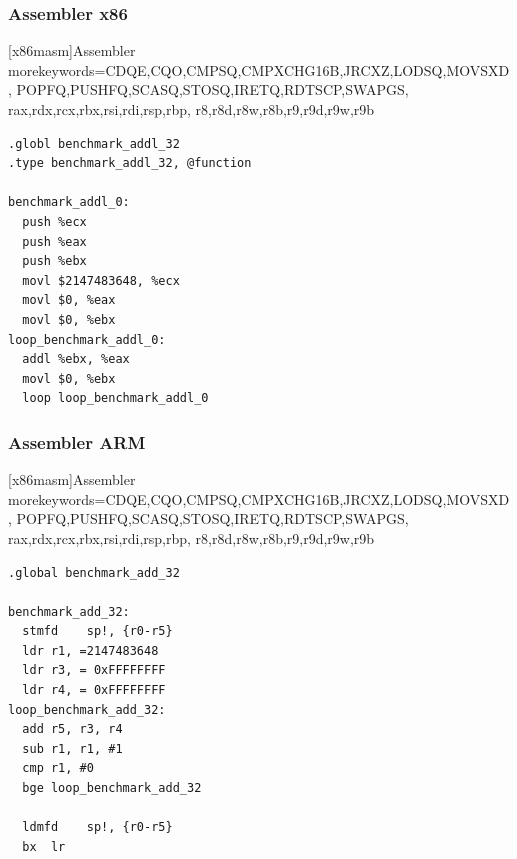 \documentclass{beamer}
\begin{document}
\begin{frame}[fragile]
\frametitle{Assembler x86} 


   [x86masm]{Assembler} %
   {morekeywords={CDQE,CQO,CMPSQ,CMPXCHG16B,JRCXZ,LODSQ,MOVSXD, %
                  POPFQ,PUSHFQ,SCASQ,STOSQ,IRETQ,RDTSCP,SWAPGS, %
                  rax,rdx,rcx,rbx,rsi,rdi,rsp,rbp, %
                  r8,r8d,r8w,r8b,r9,r9d,r9w,r9b}} %

\lstset{language=[x64]Assembler}

\begin{lstlisting}
.globl benchmark_addl_32
.type benchmark_addl_32, @function

benchmark_addl_0:
  push %ecx
  push %eax
  push %ebx
  movl $2147483648, %ecx
  movl $0, %eax
  movl $0, %ebx
loop_benchmark_addl_0:
  addl %ebx, %eax
  movl $0, %ebx
  loop loop_benchmark_addl_0
\end{lstlisting}
\end{frame}



\begin{frame}[fragile]
\frametitle{Assembler ARM} 


   [x86masm]{Assembler} %
   {morekeywords={CDQE,CQO,CMPSQ,CMPXCHG16B,JRCXZ,LODSQ,MOVSXD, %
                  POPFQ,PUSHFQ,SCASQ,STOSQ,IRETQ,RDTSCP,SWAPGS, %
                  rax,rdx,rcx,rbx,rsi,rdi,rsp,rbp, %
                  r8,r8d,r8w,r8b,r9,r9d,r9w,r9b}} %

\lstset{language=[x64]Assembler}

\begin{lstlisting}
.global benchmark_add_32

benchmark_add_32:
  stmfd    sp!, {r0-r5}
  ldr r1, =2147483648
  ldr r3, = 0xFFFFFFFF
  ldr r4, = 0xFFFFFFFF
loop_benchmark_add_32:
  add r5, r3, r4
  sub r1, r1, #1
  cmp r1, #0
  bge loop_benchmark_add_32

  ldmfd    sp!, {r0-r5}
  bx  lr

\end{lstlisting}
\end{frame}
\end{document}
